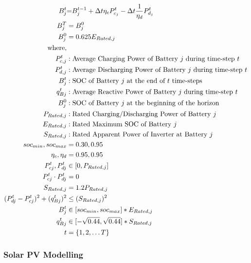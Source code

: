 \begin{gather}
	\begin{align}
		{\color{black}{ B_{j}^{t} }} &\color{black}{=} { \color{black}{ B_{j}^{t-1} + \Delta t  \eta_c P_{c_j}^t - \Delta t\frac{1}{\eta_d} P_{d_j}^t } } \\
		{ B_{j}^{T} } &= { B_{j}^{0}} \\
		{ B_{j}^{0} } &= { 0.625E_{Rated, j} } \\
		{\text{where,}} & {} \nonumber\\
		{P^t_{c,j}} &: {\text{Average Charging Power of Battery $j$ during time-step $t$}} \nonumber\\
		{P^t_{d,j}} &: {\text{Average Discharging Power of Battery $j$ during time-step $t$}} \nonumber\\
		{B^t_j} &: {\text{SOC of Battery $j$ at the end of $t$ time-steps}} \nonumber\\
		{q^t_{Bj}} &: {\text{Average Reactive Power of Battery $j$ during time-step $t$ }} \nonumber\\
		{B^0_j} &: {\text{SOC of Battery $j$ at the beginning of the horizon}} \nonumber\\
		{P_{Rated, j}} &: {\text{Rated Charging/Discharging Power of Battery $j$}} \nonumber\\
		{E_{Rated, j}} &: {\text{Rated Maximum SOC of Battery $j$}} \nonumber\\
		{S_{Rated, j}} &: {\text{Rated Apparent Power of Inverter at Battery $j$}} \nonumber\\
		{ soc_{min}, soc_{max} } &= {0.30, 0.95} \\
		{ \eta_c, \eta_d } &= {0.95, 0.95} \\
		{P^t_{cj}, P^t_{dj}} &\in {[0, P_{Rated, j}]} \\
		{P^t_{cj} \cdot P^t_{dj}} &= {0} \\
		{S_{Rated,j}} &= {1.2P_{Rated,j}} \\
		{ (P^t_{dj} - P^t_{cj})^2 + (q^t_{Bj})^2} &\leq {(S_{Rated,j})^2} \\
		{B^t_{j}} &\in {[soc_{min}, soc_{max}]*E_{Rated, j}} \\
		{q^t_{Bj}} &\in {[-\sqrt{0.44}, \sqrt{0.44}]*S_{Rated,j}} \\
		{t} &= {\{1, 2, \ldots T\}}
	\end{align}
\end{gather}

\subsubsection*{Solar PV Modelling}

